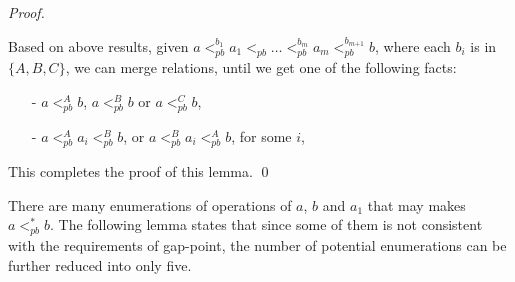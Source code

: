 \begin {proof}
\begin{itemize}
\end{itemize}

Based on above results, given $a <_{\textit{pb}}^{b_1} a_1 <_{\textit{pb}} \ldots <_{\textit{pb}}^{b_m} a_m <_{\textit{pb}}^{b_{\textit{m+1}}} b$, where each $b_i$ is in $\{ A,B,C \}$, we can merge relations, until we get one of the following facts:

\begin{itemize}
\setlength{\itemsep}{0.5pt}
\item[-] $a <_{\textit{pb}}^A b$, $a <_{\textit{pb}}^B b$ or $a <_{\textit{pb}}^C b$,

\item[-] $a <_{\textit{pb}}^A a_i <_{\textit{pb}}^B b$, or $a <_{\textit{pb}}^B a_i <_{\textit{pb}}^A b$, for some $i$,
\end{itemize}

This completes the proof of this lemma. \qed
\end {proof}

There are many enumerations of operations of $a$, $b$ and $a_1$ that may makes $a <_{\textit{pb}}^* b$. The following lemma states that since some of them is not consistent with the requirements of gap-point, the number of potential enumerations can be further reduced into only five.


